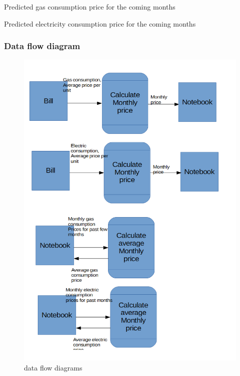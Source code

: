 \begin{algorithm}[H]
	\caption{Predicted gas consumption price for the coming months}
\begin{algorithmic}[H]
\end{algorithmic}
\end{algorithm}

\begin{algorithm}[H]
	\caption{Predicted electricity consumption price for the coming months}
\begin{algorithmic}[H]
\end{algorithmic}
\end{algorithm}

\subsubsection{Data flow diagram}
\begin{figure}[H]
    \includegraphics[width=\textwidth]{./dataflowdiagrams1.png}
    \caption{data flow diagrams} \label{fig:dataflowdiagrams}
\end{figure}


